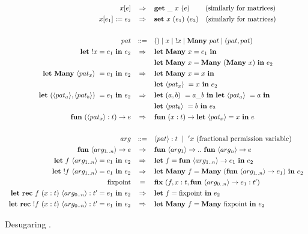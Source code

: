 \begin{figure}[p]
\begin{center}
\[\def\arraystretch{1.3}
    \begin{array}{rcl}
    x[e] &
    \Rightarrow &
    \ottkw{get}\ \_\ x\ (e) \:\qquad \textrm{(similarly for matrices)}
\\
    x[e_1] := e_2 &
    \Rightarrow &
    \ottkw{set}\ x\ (e_1)\ (e_2) \quad \textrm{(similarly for matrices)}
\\
\\
    pat & ::= & () \mid x \mid {!x} \mid \Many\ pat \mid (pat, pat)
\\
    \Let\ !x = e_1\ \In\ e_2 &
    \Rightarrow &
    \specialcell[t]{l}{%
        \Let\ \Many\ x = e_1\ \In \\
        \Let\ \Many\ x = \Many\ (\Many\ x)\ \In\ e_2}
\\
    \Let\ \Many\ \langle pat_x \rangle\ = e_1\ \In\ e_2 &
    \Rightarrow &
    \specialcell[t]{l}{%
        \Let\ \Many\ x = x\ \In \\
        \Let\ \langle pat_x \rangle\ = x\ \In\ e_2}
\\
    \Let\ (\langle pat_a \rangle, \langle pat_b \rangle)\ = e_1\ \In\ e_2 &
    \Rightarrow &
    \specialcell[t]{l}{%
        \Let\ (a,b)\ = a\_b\ \In\
        \Let\ \langle pat_a \rangle\ = a\ \In \\
        \Let\ \langle pat_b \rangle\ = b\ \In\ e_2}
\\
    \ottkw{fun}\ (\langle pat_x \rangle : t) \rightarrow e &
    \Rightarrow &
    \ottkw{fun}\ (x : t) \rightarrow \Let\ \langle pat_x \rangle = x\ \In\ e
\\
\\
    arg & ::= & \langle pat \rangle : t\ \mid\ {'x} \textrm{ (fractional permission variable)}
\\
    \ottkw{fun}\ \langle arg_{1 .. n} \rangle \rightarrow e &
    \Rightarrow &
    \ottkw{fun}\ \langle arg_1 \rangle \rightarrow ..
    \ \ottkw{fun}\ \langle arg_n \rangle \rightarrow e
\\
    \Let\ f\ {\langle arg_{1 .. n} \rangle} = e_1\ \In\ e_2 &
    \Rightarrow &
    \Let\ f = \ottkw{fun}\ {\langle arg_{1 .. n} \rangle} \rightarrow e_1\
    \In\ e_2
\\
    \Let\ !f\ {\langle arg_{1 .. n} \rangle} = e_1\ \In\ e_2 &
    \Rightarrow &
    \Let\ \Many\ f = \Many\ (\ottkw{fun}\ {\langle arg_{1 .. n} \rangle}
    \rightarrow e_1)\ \In\ e_2
\\
    \mathrm{fixpoint} & \equiv & \ottkw{fix}\ (f, x : t, \ottkw{fun}
    \ {\langle arg_{0 .. n} \rangle} \rightarrow e_1 : {t'} )
\\
    \Let\ \ottkw{rec}\ f\ (x : t)\ {\langle arg_{0 .. n} \rangle} : {t'} = e_1\ \In\ e_2 &
    \Rightarrow &
    \Let\ f = \mathrm{fixpoint}\ \In\ e_2
\\
    \Let\ \ottkw{rec}\ !f\ (x : t)\ {\langle arg_{0 .. n} \rangle} : {t'} = e_1\ \In\ e_2 &
    \Rightarrow &
    \Let\ \Many\ f = \Many\ \mathrm{fixpoint}\ \In\ e_2
    \end{array}
\]
\end{center}
\caption{Desugaring \lang.}\label{fig:lang_desugar}
\end{figure}

